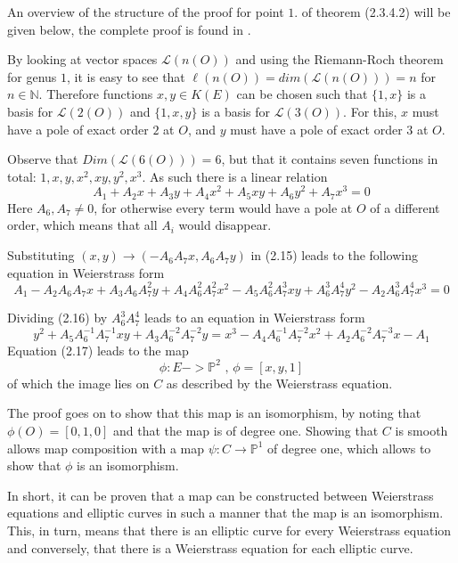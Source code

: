 An overview of the structure of the proof for point $1.$ of theorem (2.3.4.2) will be given below, the complete proof is found in \cite[pages 59-60]{EllipticCurvesBook}.
\begin{prf}
	By looking at vector spaces $\mathcal{L}(n(O))$ and using the Riemann-Roch theorem for genus $1$, it is easy to see that $\ell(n(O))=dim(\mathcal{L}(n(O)))=n$ for $n\in\mathbb{N}$. Therefore functions $x,y\in K(E)$ can be chosen such that $\{1,x\}$ is a basis for $\mathcal{L}(2(O))$ and $\{1,x,y\}$ is a basis for $\mathcal{L}(3(O))$. For this, $x$ must have a pole of exact order $2$ at $O$, and $y$ must have a pole of exact order $3$ at $O$.
	
	Observe that $Dim(\mathcal{L}(6(O)))=6$, but that it contains seven functions in total: $1,x,y,x^2,xy,y^2,x^3$. As such there is a linear relation
	\begin{equation}
	A_1+A_2x+A_3y+A_4x^2+A_5xy+A_6y^2+A_7x^3=0
	\end{equation}
	Here $A_6,A_7\neq0$, for otherwise every term would have a pole at $O$ of a different order, which means that all $A_i$ would disappear.
	
	Substituting $(x,y)\to(-A_6A_7x,A_6A_7y)$ in (2.15) leads to the following equation in Weierstrass form
	\begin{equation}
	A_1-A_2A_6A_7x+A_3A_6A_7^2y+A_4A_6^2A_7^2x^2-A_5A_6^2A_7^3xy+A_6^{3}A_7^{4}y^2-A_2A_6^{3}A_7^{4}x^3=0
	\end{equation}
	
	Dividing (2.16) by $A_6^3A_7^4$ leads to an equation in Weierstrass form
	\begin{equation}
	y^2+A_5A_6^{-1}A_7^{-1}xy+A_3A_6^{-2}A_7^{-2}y=x^3-A_4A_6^{-1}A_7^{-2}x^2+A_2A_6^{-2}A_7^{-3}x-A_1
	\end{equation}
	Equation (2.17) leads to the map
	\begin{equation*}
	\phi:E->\mathbb{P}^2\text{ ,	}\phi=[x,y,1]
	\end{equation*}
	of which the image lies on $C$ as described by the Weierstrass equation.
	
	The proof goes on to show that this map is an isomorphism, by noting that $\phi(O)=[0,1,0]$ and that the map is of degree one. Showing that $C$ is smooth allows map composition with a map $\psi:C\to\mathbb{P}^1$ of degree one, which allows to show that $\phi$ is an isomorphism.
\end{prf}
In short, it can be proven that a map can be constructed between Weierstrass equations and elliptic curves in such a manner that the map is an isomorphism. This, in turn, means that there is an elliptic curve for every Weierstrass equation and conversely, that there is a Weierstrass equation for each elliptic curve.


